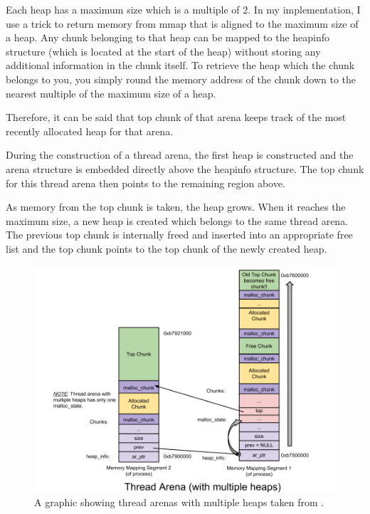 \documentclass{article}
\begin{document}
Each heap has a maximum size which is a multiple of 2. In my implementation, I use a trick to return memory from mmap that is aligned to the maximum size of a heap. Any chunk belonging to that heap can be mapped to the heapinfo structure (which is located at the start of the heap) without storing any additional information in the chunk itself. To retrieve the heap which the chunk belongs to you, you simply round the memory address of the chunk down to the nearest multiple of the maximum size of a heap.

Therefore, it can be said that top chunk of that arena keeps track of the most recently allocated heap for that arena.

During the construction of a thread arena, the first heap is constructed and the arena structure is embedded directly above the heapinfo structure. The top chunk for this thread arena then points to the remaining region above.

As memory from the top chunk is taken, the heap grows. When it reaches the maximum size, a new heap is created which belongs to the same thread arena. The previous top chunk is internally freed and inserted into an appropriate free list and the top chunk points to the top chunk of the newly created heap.


\begin{figure}[!htb]
  \caption{A graphic showing thread arenas with multiple heaps taken from \cite{sploitfun}.}
  \center
\includegraphics[scale=0.2]{image/threadarenas.png}
\end{figure}
\end{document}
